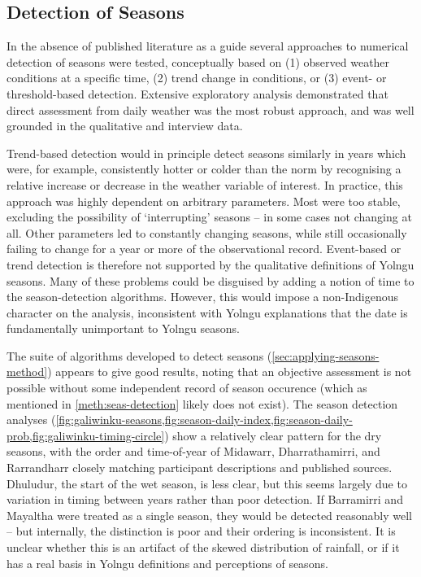 \subsection{Detection of Seasons}
\label{subsec:disc-season-detection}

In the absence of published literature as a guide several approaches to numerical
detection of seasons were tested, conceptually based on (1) observed weather conditions
at a specific time, (2) trend change in conditions, or (3) event- or threshold-based
detection.  Extensive exploratory analysis demonstrated that direct assessment
from daily weather was the most robust approach, and was well grounded in the
qualitative and interview data.

Trend-based detection would in principle detect seasons similarly in years
which were, for example, consistently hotter or colder than the norm by recognising
a relative increase or decrease in the weather variable of interest.
In practice, this approach was highly dependent on arbitrary parameters.
Most were too stable, excluding the possibility of `interrupting' seasons --
in some cases not changing at all.  Other parameters led to constantly
changing seasons, while still occasionally failing to change for a
year or more of the observational record.  Event-based or trend detection
is therefore not supported by the qualitative definitions of Yolngu seasons.
%
Many of these problems could be disguised by adding a notion of time to the
season-detection algorithms.  However, this would impose a non-Indigenous
character on the analysis, inconsistent with Yolngu explanations that the date
is fundamentally unimportant to Yolngu seasons.


The suite of algorithms developed to detect seasons (\cref{sec:applying-seasons-method})
appears to give good results, noting that an objective assessment is not
possible without some independent record of season occurence (which as
mentioned in \cref{meth:seas-detection} likely does not exist).
%
The season detection analyses
(\cref{fig:galiwinku-seasons,fig:season-daily-index,fig:season-daily-prob,fig:galiwinku-timing-circle})
show a relatively clear pattern for the
dry seasons, with the order and time-of-year of Midawarr, Dharrathamirri, and
Rarrandharr closely matching participant descriptions and published sources.
Dhuludur, the start of the wet season, is less clear, but this seems largely due to variation in timing between
years rather than poor detection.  If Barramirri and Mayaltha were treated as
a single season, they would be detected reasonably well -- but internally,
the distinction is poor and their ordering is inconsistent. It is unclear
whether this is an artifact of the skewed distribution of rainfall,
or if it has a real basis in Yolngu definitions and perceptions of seasons.


